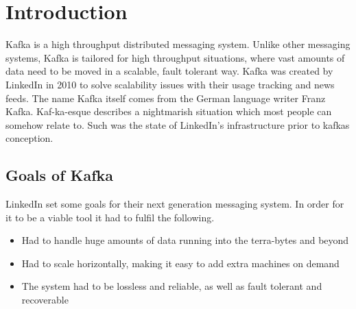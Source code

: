 \section{Introduction}

Kafka is a high throughput distributed messaging system. Unlike other messaging systems, Kafka is tailored for high throughput situations, where vast amounts of data need to be moved in a scalable, fault tolerant way. Kafka was created by LinkedIn in 2010 to solve scalability issues with their usage tracking and news feeds. The name Kafka itself comes from the German language writer Franz Kafka. Kaf-ka-esque describes a nightmarish situation which most people can somehow relate to. Such was the state of LinkedIn's infrastructure prior to kafkas conception.

\subsection{Goals of Kafka}

LinkedIn set some goals for their next generation messaging system. In order for it to be a viable tool it had to fulfil the following.

\begin{itemize}
  \item Had to handle huge amounts of data running into the terra-bytes and beyond
  \item Had to scale horizontally, making it easy to add extra machines on demand
  \item The system had to be lossless and reliable, as well as fault tolerant and recoverable
\end{itemize}